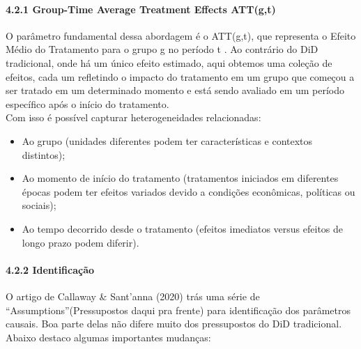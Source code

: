 \documentclass[
  brazilian,
  12pt,
  a4paper,
]{article}
\providecommand{\tightlist}{%
  \setlength{\itemsep}{0pt}\setlength{\parskip}{0pt}}
\begin{document}
\paragraph{\texorpdfstring{\textbf{4.2.1 Group-Time Average Treatment
Effects
ATT(g,t)}}{4.2.1 Group-Time Average Treatment Effects ATT(g,t)}}\label{group-time-average-treatment-effects-attgt}

O parâmetro fundamental dessa abordagem é o ATT(g,t), que representa o
Efeito Médio do Tratamento para o grupo g no período t . Ao contrário do
DiD tradicional, onde há um único efeito estimado, aqui obtemos uma
coleção de efeitos, cada um refletindo o impacto do tratamento em um
grupo que começou a ser tratado em um determinado momento e está sendo
avaliado em um período específico após o início do tratamento.\\
Com isso é possível capturar heterogeneidades relacionadas:

\begin{itemize}
\tightlist
\item
  Ao grupo (unidades diferentes podem ter características e contextos
  distintos);\\
\item
  Ao momento de início do tratamento (tratamentos iniciados em
  diferentes épocas podem ter efeitos variados devido a condições
  econômicas, políticas ou sociais);\\
\item
  Ao tempo decorrido desde o tratamento (efeitos imediatos versus
  efeitos de longo prazo podem diferir).
\end{itemize}

\paragraph{\texorpdfstring{\textbf{4.2.2
Identificação}}{4.2.2 Identificação}}\label{identificauxe7uxe3o}

O artigo de Callaway \& Sant'anna (2020) trás uma série de
``Assumptions''(Pressupostos daqui pra frente) para identificação dos
parâmetros causais. Boa parte delas não difere muito dos pressupostos do
DiD tradicional. Abaixo destaco algumas importantes mudanças:
\end{document}
